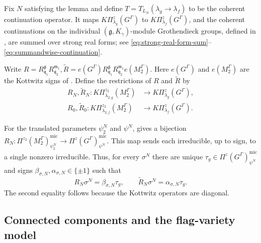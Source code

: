 \documentclass[10pt]{amsart}
\numberwithin{equation}{section}
\theoremstyle{plain}
\theoremstyle{definition}
\theoremstyle{remark}
\newcommand{\fg}{\mathfrak g}
\newcommand{\fm}{\mathfrak m}
\newcommand{\fq}{\mathfrak q}
\newcommand{\mic}{\mathrm{mic}}
\begin{document}
Fix $N$ satisfying the lemma and define
$T=T_{L_N}(\lambda_g\to\lambda_f)$ to be the coherent continuation operator. It maps
$K\Pi_{\lambda_g}^z(G^\Gamma)$ to $K\Pi_{\lambda_f}^z(G^\Gamma)$, and the
coherent continuations on the individual
$(\fg,K_\gamma)$-module Grothendieck groups, defined in
\cite[Definition~2.10.3]{AIMV26}, are summed over strong real forms; see
\eqref{eq:strong-real-form-sum}--\eqref{eq:summandwise-continuation}.

Write $
 R=R_{\fq_1}^{\fg}R_{\fq_2}^{\fm_1},
 \widetilde R
 =e(G^\Gamma)R_{\fq_1}^{\fg}R_{\fq_2}^{\fm_1}e(M_2^\Gamma).
$
Here $e(G^\Gamma)$ and $e(M_2^\Gamma)$ are the Kottwitz signs of
\cite[Theorem~4.2.3]{AIMV26}. Define the restrictions of $R$ and
$\widetilde R$ by
\[
\begin{aligned}
 R_N,\widetilde R_N\colon
 K\Pi_{\lambda_{2,g}}^{z_2}(M_2^\Gamma)
 &\longrightarrow K\Pi_{\lambda_g}^{z}(G^\Gamma),\\
 R_0,\widetilde R_0\colon
 K\Pi_{\lambda_{2,f}}^{z_2}(M_2^\Gamma)
 &\longrightarrow K\Pi_{\lambda_f}^{z}(G^\Gamma).
\end{aligned}
\]

For the translated parameters $\psi_2^N$ and $\psi^N$,
\cite[Remark~4.5.2]{AIMV26} gives a bijection $
 R_N\colon
 \Pi^{z_2}(M_2^\Gamma)^{\mic}_{\psi_2^N}
 \longrightarrow
 \Pi^z(G^\Gamma)^{\mic}_{\psi^N}
$.
This map sends each irreducible, up to sign, to a single nonzero irreducible.
Thus, for every $\sigma^N$ there are unique
$\tau_g\in\Pi^z(G^\Gamma)^{\mic}_{\psi^N}$ and signs
$\beta_{\sigma,N},\alpha_{\sigma,N}\in\{\pm1\}$ such that
\begin{equation}\label{eq:good-range}
 R_N\sigma^N=\beta_{\sigma,N}\tau_g,
 \qquad
 \widetilde R_N\sigma^N=\alpha_{\sigma,N}\tau_g.
\end{equation}
The second equality follows because the Kottwitz operators are diagonal.

\subsection{Connected components and the flag-variety model}
\end{document}
